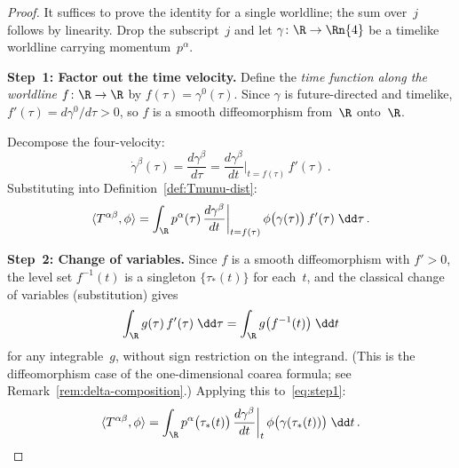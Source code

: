 \begin{proof}
  It suffices to prove the identity for a single worldline; the
  sum over~$j$ follows by linearity.  Drop the subscript~$j$ and
  let $\gamma\colon \R \to \Rn{4}$ be a timelike worldline
  carrying momentum~$p^\alpha$.

  \medskip\noindent
  \textbf{Step~1: Factor out the time velocity.}\;
  Define the \emph{time function along the worldline}
  $f\colon \R \to \R$ by $f(\tau) = \gamma^0(\tau)$.
  Since $\gamma$ is future-directed and timelike,
  $f'(\tau) = d\gamma^0/d\tau > 0$, so $f$ is a smooth
  diffeomorphism from~$\R$ onto~$\R$.

  Decompose the four-velocity:
  \[
    \dot\gamma^\beta(\tau)
      = \frac{d\gamma^\beta}{d\tau}
      = \frac{d\gamma^\beta}{dt}\bigg|_{t=f(\tau)}\,f'(\tau)\,.
  \]
  Substituting into Definition~\ref{def:Tmunu-dist}:
  \begin{equation}\label{eq:step1}
    \langle T^{\alpha\beta},\phi\rangle
      = \int_{\R} p^\alpha(\tau)\,
        \frac{d\gamma^\beta}{dt}\bigg|_{t=f(\tau)}\,
        \phi\bigl(\gamma(\tau)\bigr)\,f'(\tau)\;\dd\tau\,.
  \end{equation}

  \medskip\noindent
  \textbf{Step~2: Change of variables.}\;
  Since $f$ is a smooth diffeomorphism with $f' > 0$, the level
  set $f^{-1}(t)$ is a singleton $\{\tau_\ast(t)\}$ for each~$t$,
  and the classical change of variables (substitution) gives
  \[
    \int_{\R} g(\tau)\,f'(\tau)\;\dd\tau
      = \int_{\R} g\bigl(f^{-1}(t)\bigr)\;\dd t
  \]
  for any integrable~$g$, without sign restriction on the
  integrand.  (This is the diffeomorphism case of the
  one-dimensional coarea formula; see
  Remark~\ref{rem:delta-composition}.)  Applying this
  to~\eqref{eq:step1}:
  \begin{equation}\label{eq:step2}
    \langle T^{\alpha\beta},\phi\rangle
      = \int_{\R} p^\alpha\bigl(\tau_\ast(t)\bigr)\,
        \frac{d\gamma^\beta}{dt}\bigg|_{t}\,
        \phi\bigl(\gamma(\tau_\ast(t))\bigr)\;\dd t\,.
  \end{equation}


\end{proof}
